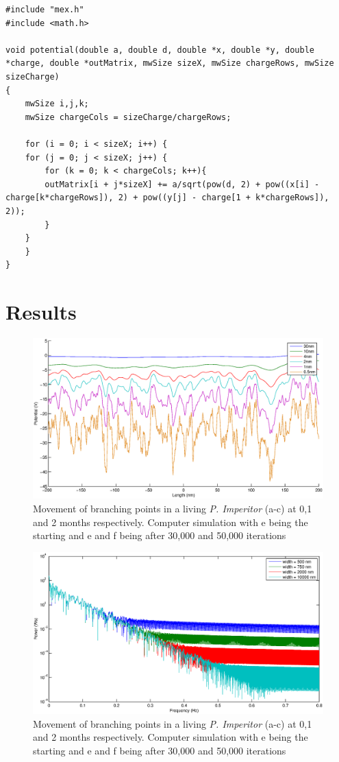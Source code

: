 \documentclass[]{article}
\begin{document}
\lstset{language=C}  
\begin{lstlisting}
#include "mex.h"
#include <math.h>

void potential(double a, double d, double *x, double *y, double *charge, double *outMatrix, mwSize sizeX, mwSize chargeRows, mwSize sizeCharge)
{
    mwSize i,j,k;
    mwSize chargeCols = sizeCharge/chargeRows;

    for (i = 0; i < sizeX; i++) {
	for (j = 0; j < sizeX; j++) {
	    for (k = 0; k < chargeCols; k++){
		outMatrix[i + j*sizeX] += a/sqrt(pow(d, 2) + pow((x[i] - charge[k*chargeRows]), 2) + pow((y[j] - charge[1 + k*chargeRows]), 2));
	    }
	}
    }
}
\end{lstlisting}

\section{Results}

\begin{figure}
\centering
\includegraphics[width=\textwidth]{potentials.eps}
\caption{Movement of branching points in a living \emph{P. Imperitor} (a-c) at 0,1 and 2 months respectively.
Computer simulation with e being the starting and e and f being after 30,000 and 50,000 iterations \label{branching}}
\end{figure}

\begin{figure}
\centering
\includegraphics[width=\textwidth]{Fouriers_with_varying_range.eps}
\caption{Movement of branching points in a living \emph{P. Imperitor} (a-c) at 0,1 and 2 months respectively.
Computer simulation with e being the starting and e and f being after 30,000 and 50,000 iterations \label{branching}}
\end{figure}
\end{document}

